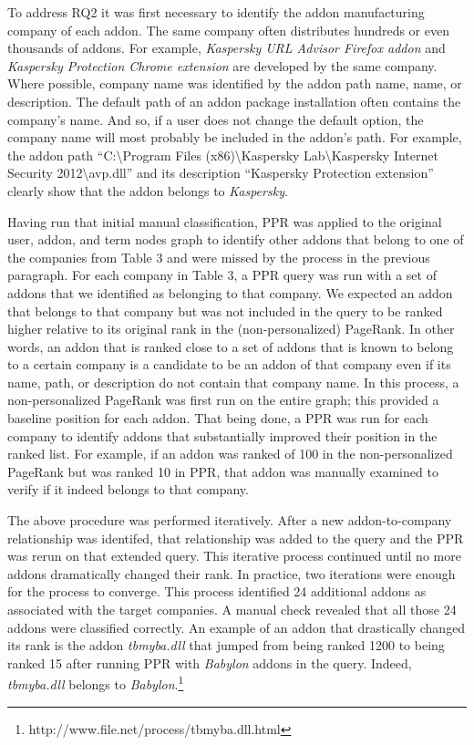 \documentclass{article} %
\begin{document}
To address RQ2 it was first necessary to identify the addon manufacturing company of each\textit{ }addon. The same company often distributes hundreds or even thousands of addons. For example, \textit{Kaspersky URL Advisor Firefox addon} and \textit{Kaspersky Protection Chrome extension} are developed by the same company. Where possible, company name was identified by the addon path name, name, or description. The default path of an addon package installation often contains the company's name. And so, if a user does not change the default option, the company name will most probably be included in the addon's path. For example, the addon path ``C:{\textbackslash}Program Files (x86){\textbackslash}Kaspersky Lab{\textbackslash}Kaspersky Internet Security 2012{\textbackslash}avp.dll'' and its description ``Kaspersky Protection extension'' clearly show that the addon belongs to \textit{Kaspersky}. 

Having run that initial manual classification, PPR was applied to the original user, addon, and term nodes graph to identify other addons that belong to one of the companies from Table 3 and were missed by the process in the previous paragraph. For each company in Table 3, a PPR query was run with a set of addons that we identified as belonging to that company. We expected an addon that belongs to that company but was not included in the query to be ranked higher relative to its original rank in the (non-personalized) PageRank. In other words, an addon that is ranked close to a set of addons that is known to belong to a certain company is a candidate to be an addon of that company even if its name, path, or description do not contain that company name. In this process, a non-personalized PageRank was first run on the entire graph; this provided a baseline position for each addon. That being done, a PPR was run for each company to identify addons that substantially improved their position in the ranked list. For example, if an addon was ranked of 100 in the non-personalized PageRank but was ranked 10 in PPR, that addon was manually examined to verify if it indeed belongs to that company. 

The above procedure was performed iteratively. After a new addon-to-company relationship was identifed, that relationship was added to the query and the PPR was rerun on that extended query. This iterative process continued until no more addons dramatically changed their rank. In practice, two iterations were enough for the process to converge. This process identified 24 additional addons as associated with the target companies. A manual check revealed that all those 24 addons were classified correctly. An example of an addon that drastically changed its rank is the addon \textit{tbmyba.dll }that jumped from being ranked 1200 to being ranked 15 after running PPR with \textit{Babylon} addons in the query. Indeed, \textit{tbmyba.dll }belongs to \textit{Babylon}.\footnote{ http://www.file.net/process/tbmyba.dll.html}
\end{document}
